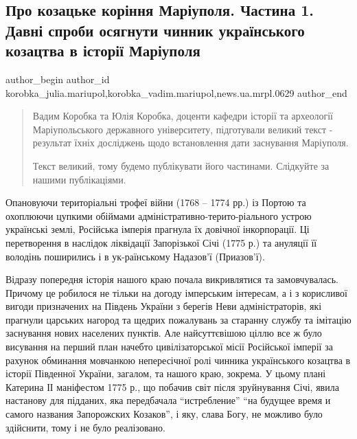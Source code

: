 
 
 
 
 
 
\subsection{Про козацьке коріння Маріуполя. Частина 1. Давні спроби осягнути чинник українського козацтва в історії Маріуполя}
\label{sec:01_09_2023.stz.news.ua.mrpl.0629.1.pro_kozacke_korinnja_mariupolja_1}
 
\ifcmt
 author_begin
   author_id korobka_julia.mariupol,korobka_vadim.mariupol,news.ua.mrpl.0629
 author_end
\fi

\begin{quote}
Вадим Коробка та Юлія Коробка, доценти кафедри історії та археології
Маріупольського державного університету, підготували великий текст - результат
їхніх досліджень щодо встановлення дати заснування Маріуполя.

Текст великий, тому будемо публікувати його частинами. Слідкуйте за нашими
публікаціями.
\end{quote}

Опановуючи територіальні трофеї війни (1768 – 1774 рр.) із Портою та охоплюючи
цупкими обіймами адміністративно-терито\hyp{}ріального устрою українські землі,
Російська імперія прагнула їх довічної інкорпорації. Ці перетворення в наслідок
ліквідації Запорізької Січі (1775 р.) та ануляції її володінь поширились і в
ук\hyp{}раїнському Надазов'ї (Приазов'ї).

Відразу попередня історія нашого краю почала викривлятися та замовчувалась.
Причому це робилося не тільки на догоду імперським інтересам, а  і з корисливої
вигоди призначених на Південь України з берегів Неви адміністраторів, які
прагнули царських нагород та щедрих пожалувань за старанну службу та імітацію
заснування нових населених пунктів. Але найсуттєвішою ціллю все ж було
висування на перший план начебто цивілізаторської місії Російської імперії за
рахунок обминання мовчанкою непересічної ролі чинника українського козацтва в
історії Південної України, загалом, та нашого краю, зокрема.  У цьому плані
Катерина ІІ маніфестом 1775 р., що побачив світ після зруйнування Січі, явила
настанову для підданих, яка передбачала \enquote{истребление} \enquote{на будущее время и
самого названия Запорожских Козаков},  і яку, слава Богу, не можливо було
здійснити, тому і не було реалізовано.


